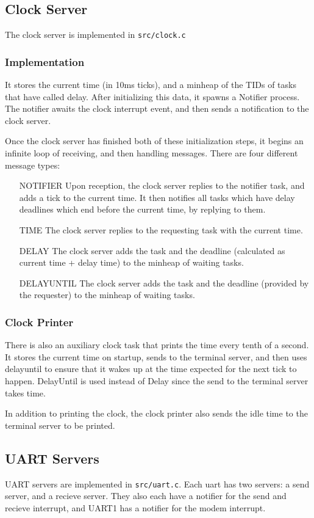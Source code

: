 \documentclass{article}
\begin{document}
\subsection{Clock Server}
The clock server is implemented in \verb|src/clock.c|

\subsubsection{Implementation}
It stores the current time (in 10ms ticks), and a minheap of the TIDs of tasks that have called delay.
After initializing this data, it spawns a Notifier process. 
The notifier awaits the clock interrupt event, and then sends a notification to the clock server.

Once the clock server has finished both of these initialization steps, it begins an infinite loop of receiving, and then handling messages.
There are four different message types:
\begin{enumerate}
    \item[NOTIFIER] Upon reception, the clock server replies to the notifier task, and adds a tick to the current time.
    It then notifies all tasks which have delay deadlines which end before the current time, by replying to them.
    \item [TIME] The clock server replies to the requesting task with the current time.
    \item[DELAY] The clock server adds the task and the deadline (calculated as current time + delay time) to the minheap of waiting tasks.
    \item[DELAYUNTIL] The clock server adds the task and the deadline (provided by the requester) to the minheap of waiting tasks.
\end{enumerate}

\subsubsection{Clock Printer}
There is also an auxiliary clock task that prints the time every tenth of a second. It stores the current time on startup, sends to the terminal server, and then uses delayuntil to ensure that it wakes up at the time expected for the next tick to happen. DelayUntil is used instead of Delay since the send to the terminal server takes time.

In addition to printing the clock, the clock printer also sends the idle time to the terminal server to be printed.

\subsection{UART Servers}
UART servers are implemented in \verb|src/uart.c|. Each uart has two servers: a send server, and a recieve server. They also each have a notifier for the send and recieve interrupt, and UART1 has a notifier for the modem interrupt.
\end{document}
